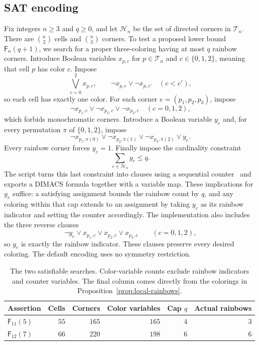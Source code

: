\documentclass[11pt,a4paper]{article}
\theoremstyle{definition}
\newcommand{\Ttri}{\mathcal T}
\newcommand{\F}{\mathsf F}
\numberwithin{equation}{section}
\begin{document}
\FloatBarrier

\subsection{SAT encoding}\label{app:sat}
Fix integers $n\ge3$ and $q\ge0$, and let $\mathcal H_n$ be the set of directed corners in $\Ttri_n$. There are $\binom n2$ cells and $\binom n3$ corners. To test a proposed lower bound $\F_n(q+1)$, we search for a proper three-coloring having at most $q$ rainbow corners. Introduce Boolean variables $x_{p,c}$ for $p\in\Ttri_n$ and $c\in\{0,1,2\}$, meaning that cell $p$ has color $c$. Impose
\[
\bigvee_{c=0}^2 x_{p,c},\qquad
\neg x_{p,c}\vee\neg x_{p,c'}\quad(c<c'),
\]
so each cell has exactly one color. For each corner $e=(p_1,p_2,p_3)$, impose
\[
\neg x_{p_1,c}\vee\neg x_{p_2,c}\vee\neg x_{p_3,c}
\quad(c=0,1,2),
\]
which forbids monochromatic corners. Introduce a Boolean variable $y_e$ and, for every permutation $\pi$ of $\{0,1,2\}$, impose
\[
\neg x_{p_1,\pi(0)}\vee\neg x_{p_2,\pi(1)}\vee
\neg x_{p_3,\pi(2)}\vee y_e.
\]
Every rainbow corner forces $y_e=1$. Finally impose the cardinality constraint
\[
\sum_{e\in\mathcal H_n}y_e\le q.
\]
The script  turns this last constraint into clauses using a sequential counter~\cite{Sinz05} and exports a DIMACS formula together with a variable map. These implications for $y_e$ suffice: a satisfying assignment bounds the rainbow count by $q$, and any coloring within that cap extends to an assignment by taking $y_e$ as its rainbow indicator and setting the counter accordingly. The implementation also includes the three reverse clauses
\[
\neg y_e\vee x_{p_1,c}\vee x_{p_2,c}\vee x_{p_3,c}
\qquad(c=0,1,2),
\]
so $y_e$ is exactly the rainbow indicator. These clauses preserve every desired coloring. The default encoding uses no symmetry restriction.

\begin{table}[!ht]
	\centering\small
	\caption{The two satisfiable searches. Color-variable counts exclude rainbow indicators and counter variables. The final column comes directly from the colorings in Proposition~\ref{prop:local-rainbows}.}\label{tab:sat-targets}
	\begin{tabular}{@{}lrrrrr@{}}
		\toprule Assertion & Cells & Corners & Color variables & Cap $q$ & Actual rainbows\\\midrule
		$\F_{11}(5)$ & $55$ & $165$ & $165$ & $4$ & $3$\\
		$\F_{12}(7)$ & $66$ & $220$ & $198$ & $6$ & $6$\\\bottomrule
	\end{tabular}
\end{table}
\end{document}
